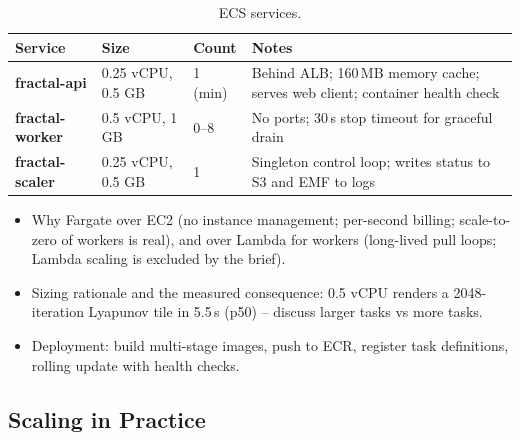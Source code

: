 \documentclass[a4paper,12pt]{article}
\begin{document}
\begin{table}[H]
\centering
\small
\begin{tabularx}{\linewidth}{>{\bfseries}p{2.6cm} p{2.2cm} p{2.0cm} X}
\toprule
Service & Size & Count & Notes \\
\midrule
fractal-api & 0.25 vCPU, 0.5 GB & 1 (min) & Behind ALB; 160\,MB memory cache; serves web client; container health check \\
fractal-worker & 0.5 vCPU, 1 GB & 0--8 & No ports; 30\,s stop timeout for graceful drain \\
fractal-scaler & 0.25 vCPU, 0.5 GB & 1 & Singleton control loop; writes status to S3 and EMF to logs \\
\bottomrule
\end{tabularx}
\caption{ECS services.}
\label{tab:services}
\end{table}

\begin{yourwriting}
\begin{itemize}
    \item Why Fargate over EC2 (no instance management; per-second billing; scale-to-zero of workers is real), and over Lambda for workers (long-lived pull loops; Lambda scaling is excluded by the brief).
    \item Sizing rationale and the measured consequence: 0.5 vCPU renders a 2048-iteration Lyapunov tile in 5.5\,s (p50) -- discuss larger tasks vs more tasks.
    \item Deployment: build multi-stage images, push to ECR, register task definitions, rolling update with health checks.
\end{itemize}
\end{yourwriting}

\subsection{Scaling in Practice}
\end{document}
